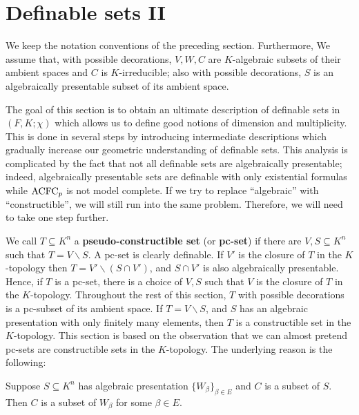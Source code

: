 \section{Definable sets II}


\noindent
We keep the notation conventions of the preceding section. Furthermore, We assume that, with possible decorations, $V, W,  C$ are $K$-algebraic subsets of their ambient spaces and $C$ is $K$-irreducible; also with possible decorations, $S$ is an algebraically presentable subset of its ambient space.

The goal of this section is to obtain an ultimate description of definable sets in $(F, K; \chi)$ which allows us to define good notions of dimension and multiplicity. 
This is done in several steps by introducing intermediate descriptions which gradually increase our geometric understanding of definable sets.
This analysis is complicated by the fact that not all definable sets are algebraically presentable; indeed, algebraically presentable sets are definable with only existential formulas while $\mathrm{ACFC}_p$ is not model complete. If we try to replace ``algebraic'' with ``constructible'', we will still run into the same problem. Therefore, we will need to take one step further.

We call $T \subseteq K^n$ a {\bf pseudo-constructible set} (or {\bf pc-set}) if there are $ V, S \subseteq K^n$   such that $T= V \backslash S$. A pc-set is clearly definable. If $V'$ is the closure of $T$ in the $K$-topology then $T= V' \backslash (S \cap V')$, and $S \cap V'$ is also algebraically presentable. Hence, if $T$ is a pc-set, there is a choice of $V, S$ such that $V$ is the closure of $T$ in the $K$-topology. Throughout the rest of this section, $T$ with possible decorations is a pc-subset of its ambient space. If $T= V \backslash S$, and $S$ has an algebraic presentation with only finitely many elements, then $T$ is a constructible set in the $K$-topology. This section is based on the observation that we can almost pretend pc-sets are constructible sets in the $K$-topology. The underlying reason is the following:

\begin{lem}\label{Smallness1}
Suppose $S \subseteq K^n$ has algebraic presentation $\{W_\beta\}_{\beta \in E}$ and $C$  is a subset of $S$. Then $C$ is a subset of $W_\beta$ for some $\beta \in E$.
\end{lem}

